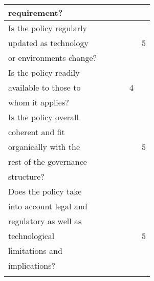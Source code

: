 \documentclass[stu]{apa7}
\begin{document}
\begin{longtable}{llllrr}
requirement? &  &  &  &  & \\
\hline
Is the policy regularly &  &  &  &  & \\
updated as technology &  &  &  &  & 5\\
or environments change? &  &  &  &  & \\
\hline
Is the policy readily &  &  &  &  & \\
available to those to &  &  &  & 4 & \\
whom it applies? &  &  &  &  & \\
\hline
Is the policy overall &  &  &  &  & \\
coherent and fit &  &  &  &  & \\
organically with the &  &  &  &  & 5\\
rest of the governance &  &  &  &  & \\
structure? &  &  &  &  & \\
\hline
Does the policy take &  &  &  &  & \\
into account legal and &  &  &  &  & \\
regulatory as well as &  &  &  &  & \\
technological &  &  &  &  & 5\\
limitations and &  &  &  &  & \\
implications? &  &  &  &  & \\
\hline
 &  &  &  &  & \\
\end{longtable}


\printbibliography
\end{document}
